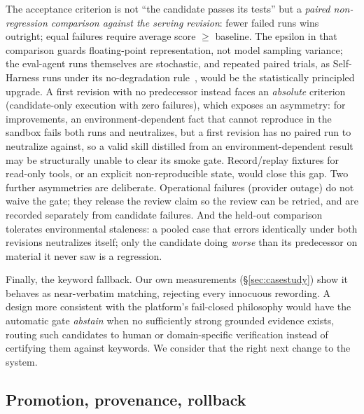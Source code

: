 \documentclass{article}
\begin{document}
The acceptance criterion is not ``the candidate passes its tests'' but a \emph{paired non-regression comparison against the serving revision}: fewer failed runs wins outright; equal failures require average score $\geq$ baseline. The epsilon in that comparison guards floating-point representation, not model sampling variance; the eval-agent runs themselves are stochastic, and repeated paired trials, as Self-Harness runs under its no-degradation rule~\citep{zhang2026selfharness}, would be the statistically principled upgrade. A first revision with no predecessor instead faces an \emph{absolute} criterion (candidate-only execution with zero failures), which exposes an asymmetry: for improvements, an environment-dependent fact that cannot reproduce in the sandbox fails both runs and neutralizes, but a first revision has no paired run to neutralize against, so a valid skill distilled from an environment-dependent result may be structurally unable to clear its smoke gate. Record/replay fixtures for read-only tools, or an explicit non-reproducible state, would close this gap. Two further asymmetries are deliberate. Operational failures (provider outage) do not waive the gate; they release the review claim so the review can be retried, and are recorded separately from candidate failures. And the held-out comparison tolerates environmental staleness: a pooled case that errors identically under both revisions neutralizes itself; only the candidate doing \emph{worse} than its predecessor on material it never saw is a regression.

Finally, the keyword fallback. Our own measurements (\S\ref{sec:casestudy}) show it behaves as near-verbatim matching, rejecting every innocuous rewording. A design more consistent with the platform's fail-closed philosophy would have the automatic gate \emph{abstain} when no sufficiently strong grounded evidence exists, routing such candidates to human or domain-specific verification instead of certifying them against keywords. We consider that the right next change to the system.

\subsection{Promotion, provenance, rollback}
\label{sec:lifecycle}
\end{document}
